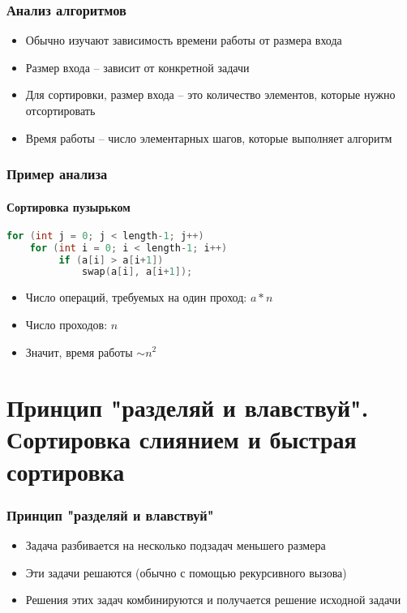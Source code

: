 \documentclass[12pt,pdf,hyperref={unicode}]{beamer}
\begin{document}
\begin{frame}[fragile]
\frametitle{Анализ алгоритмов} 
\begin{itemize}
\item Обычно изучают зависимость времени работы от размера входа \\
\item Размер входа -- зависит от конкретной задачи \\
\item Для сортировки, размер входа -- это количество элементов, которые нужно отсортировать \\
\item Время работы -- число элементарных шагов, которые выполняет алгоритм
\end{itemize}
\end{frame}

\begin{frame}[fragile]
\frametitle{Пример анализа} 
\framesubtitle{Сортировка пузырьком}
\begin{lstlisting}[language=C++,basicstyle=\ttfamily,keywordstyle=\color{blue}]
for (int j = 0; j < length-1; j++)
    for (int i = 0; i < length-1; i++)
         if (a[i] > a[i+1])
             swap(a[i], a[i+1]);
\end{lstlisting}
\begin{itemize}
\item Число операций, требуемых на один проход: $a * n$\\
\item Число проходов: $n$\\
\item Значит, время работы $\sim n^2$\\
\end{itemize}

\end{frame}


\section{Принцип "разделяй и влавствуй". Сортировка слиянием и быстрая сортировка}

\begin{frame}[fragile]
\frametitle{Принцип "разделяй и влавствуй"} 
\begin{itemize}
\item Задача разбивается на несколько подзадач меньшего размера \\
\item Эти задачи решаются (обычно с помощью рекурсивного вызова) \\
\item Решения этих задач комбинируются и получается решение исходной задачи \\
\end{itemize}
\end{frame}
\end{document}
